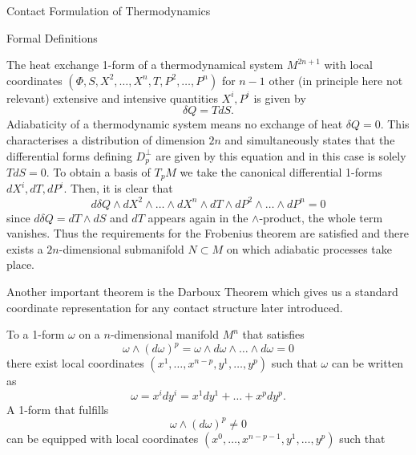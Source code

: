 \begin{section}{Contact Formulation of Thermodynamics}
\begin{subsection}{Formal Definitions}
\begin{theorem}
\end{theorem}
\begin{example}
	The heat exchange 1-form of a thermodynamical system $M^{2n+1}$ with local coordinates $(\Phi,S,X^2,\dots,X^n,T,P^2,\dots,P^n)$ for $n-1$ other (in principle here not relevant) extensive and intensive quantities $X^i,P^i$ is given by
	\begin{equation}
		\delta Q=TdS.
	\end{equation}
	Adiabaticity of a thermodynamic system means no exchange of heat $\delta Q=0$. This characterises a distribution of dimension $2n$ and simultaneously states that the differential forms defining $D^\perp_p$ are given by this equation and in this case is solely $TdS=0$. To obtain a basis of $T_pM$ we take the canonical differential 1-forms $dX^i,dT,dP^i$. Then, it is clear that
	\begin{equation}
		d\delta Q\wedge dX^2\wedge\dots\wedge dX^n\wedge dT\wedge dP^2\wedge\dots\wedge dP^n = 0
	\end{equation}
	since $d\delta Q=dT\wedge dS$ and $dT$ appears again in the $\wedge$-product, the whole term vanishes. Thus the requirements for the Frobenius theorem are satisfied and there exists a $2n$-dimensional submanifold $N\subset M$ on which adiabatic processes take place.
\end{example}
Another important theorem is the Darboux Theorem \cite{darbouxProblemePfaffPar1882} which gives us a standard coordinate representation for any contact structure later introduced.
\begin{theorem}
	To a 1-form $\omega$ on a $n$-dimensional manifold $M^n$ that satisfies 
	\begin{equation}
		\omega\wedge(d\omega)^p = \omega\wedge d\omega\wedge\dots\wedge d\omega = 0
	\end{equation}
	there exist local coordinates $(x^1,\dots,x^{n-p},y^1,\dots,y^p)$ such that $\omega$ can be written as
	\begin{equation}
		\omega = x^i dy^i = x^1dy^1+\dots+x^pdy^p.
	\end{equation}
	A 1-form that fulfills
	\begin{equation}
		\omega\wedge(d\omega)^p\neq0
	\end{equation}
	can be equipped with local coordinates $(x^0,\dots,x^{n-p-1},y^1,\dots,y^p)$ such that
	\begin{equation}

\end{equation}
\end{theorem}
\end{subsection}
\end{section}
